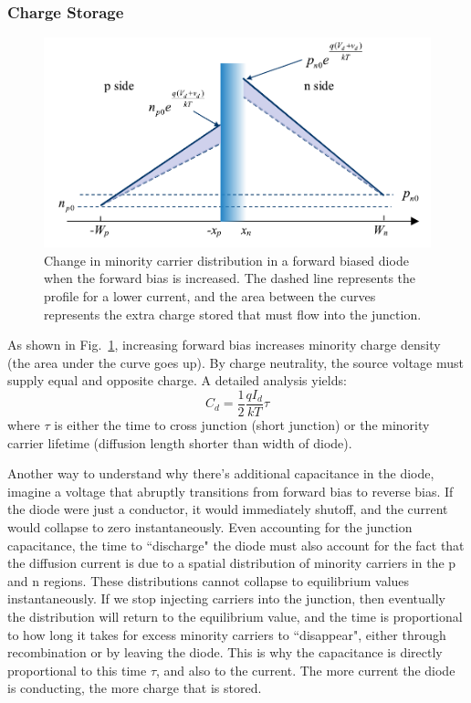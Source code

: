\subsubsection*{Charge Storage} \label{sec:charge_storage}

\begin{figure}[tb]
\begin{center}
\includegraphics[width=.75\columnwidth]{slide47}
\end{center}
\caption{Change in minority carrier distribution in a forward biased diode when the forward bias is increased.  The dashed line represents the profile for a lower current, and the area between the curves represents the extra charge stored that must flow into the junction.} \label{fig:slide47}
\end{figure}

As shown in Fig.~\ref{fig:slide47}, increasing forward bias increases minority charge density (the area under the curve goes up).   By charge neutrality, the source voltage must supply equal and opposite charge.   A detailed analysis yields:
%
\begin{equation}{C_d} = \frac{1}{2}\frac{{q{I_d}}}{{kT}}\tau \end{equation}
%
where  $\tau$ is either the time to cross junction (short junction) or the minority carrier lifetime (diffusion length shorter than width of diode).  
 
Another way to understand why there's additional capacitance in the diode, imagine a voltage that abruptly transitions from forward bias to reverse bias.  If the diode were just a conductor, it would immediately shutoff, and the current would collapse to zero instantaneously.  Even accounting for the junction capacitance, the time to ``discharge" the diode must also account for the fact that the diffusion current is due to a spatial distribution of minority carriers in the p and n regions.  These distributions cannot collapse to equilibrium values instantaneously.  If we stop injecting carriers into the junction, then eventually the distribution will return to the equilibrium value, and the time is proportional to how long it takes for excess minority carriers to ``disappear", either through recombination or by leaving the diode.  This is why the capacitance is directly proportional to this time $\tau$, and also to the current.  The more current the diode is conducting, the more charge that is stored.  



